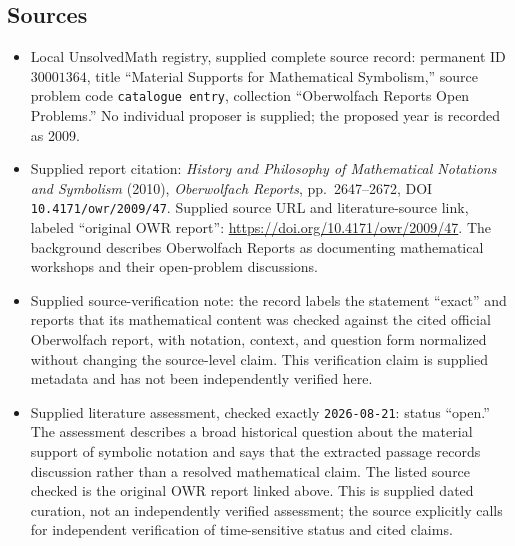 \documentclass[11pt]{article}
\begin{document}
\subsection{Sources}
\begin{itemize}
\item Local UnsolvedMath registry, supplied complete source record: permanent ID \(30001364\), title ``Material Supports for Mathematical Symbolism,'' source problem code \texttt{catalogue entry}, collection ``Oberwolfach Reports Open Problems.'' No individual proposer is supplied; the proposed year is recorded as 2009.
\item Supplied report citation: \emph{History and Philosophy of Mathematical Notations and Symbolism} (2010), \emph{Oberwolfach Reports}, pp.~2647--2672, DOI \texttt{10.4171/owr/2009/47}. Supplied source URL and literature-source link, labeled ``original OWR report'': \url{https://doi.org/10.4171/owr/2009/47}. The background describes Oberwolfach Reports as documenting mathematical workshops and their open-problem discussions.
\item Supplied source-verification note: the record labels the statement ``exact'' and reports that its mathematical content was checked against the cited official Oberwolfach report, with notation, context, and question form normalized without changing the source-level claim. This verification claim is supplied metadata and has not been independently verified here.
\item Supplied literature assessment, checked exactly \texttt{2026-08-21}: status ``open.'' The assessment describes a broad historical question about the material support of symbolic notation and says that the extracted passage records discussion rather than a resolved mathematical claim. The listed source checked is the original OWR report linked above. This is supplied dated curation, not an independently verified assessment; the source explicitly calls for independent verification of time-sensitive status and cited claims.
\end{itemize}
\end{document}
